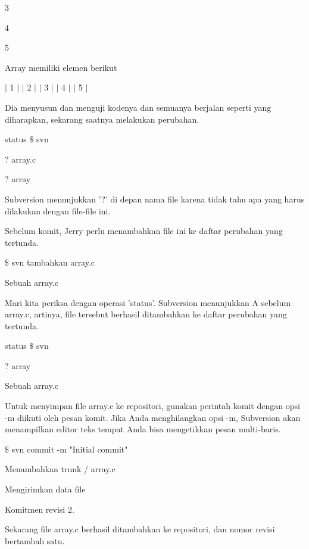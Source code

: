 \noindent 
 \hspace*{0.5in} 3 \par
\noindent 
 \hspace*{0.5in} 4 \par
\noindent 
 \hspace*{0.5in} 5 \par
\noindent 
Array memiliki elemen berikut \par
\noindent 
 \hspace*{0.5in}  $  \vert  $ 1  $  \vert  $  $  \vert  $ 2  $  \vert  $  $  \vert  $ 3  $  \vert  $  $  \vert  $ 4  $  \vert  $  $  \vert  $ 5  $  \vert  $ \par
\noindent 
Dia menyusun dan menguji kodenya dan semuanya berjalan seperti yang diharapkan, sekarang saatnya melakukan perubahan. \par
\vspace{12pt}
 status  $  \$  $ svn \par
\noindent 
? array.c \par
\noindent 
? array \par
\noindent 
Subversion menunjukkan '?' di depan nama file karena tidak tahu apa yang harus dilakukan dengan file-file ini. \par
\vspace{12pt}
\noindent 
Sebelum komit, Jerry perlu menambahkan file ini ke daftar perubahan yang tertunda. \par
\vspace{12pt}
  $  \$  $ svn tambahkan array.c \par
\noindent 
Sebuah array.c \par
\noindent 
Mari kita periksa dengan operasi 'status'. Subversion menunjukkan A sebelum array.c, artinya, file tersebut berhasil ditambahkan ke daftar perubahan yang tertunda. \par
\vspace{12pt}
 status  $  \$  $ svn \par
\noindent 
? array \par
\noindent 
Sebuah array.c \par
\noindent 
Untuk menyimpan file array.c ke repositori, gunakan perintah komit dengan opsi -m diikuti oleh pesan komit. Jika Anda menghilangkan opsi -m, Subversion akan menampilkan editor teks tempat Anda bisa mengetikkan pesan multi-baris. \par
\vspace{12pt}
  $  \$  $ svn commit -m "Initial commit" \par
\noindent 
Menambahkan trunk / array.c \par
\noindent 
Mengirimkan data file \par
\noindent 
Komitmen revisi 2. \par
\noindent 
Sekarang file array.c berhasil ditambahkan ke repositori, dan nomor revisi bertambah satu. \par
\vspace{12pt}
\vspace{12pt}
\vspace{12pt}

